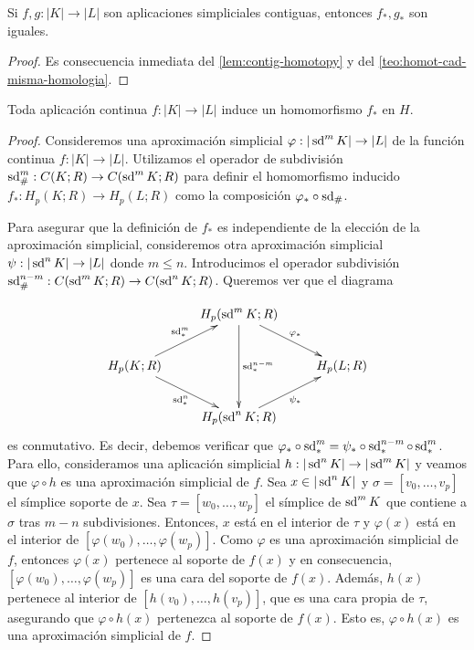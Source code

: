 \begin{corolario}
	\label{cor:contig-homotopy}
	Si $f,g : |K| \to |L|$ son aplicaciones simpliciales contiguas, entonces $f_*,g_*$ son iguales.
\end{corolario}
\begin{proof}
	Es consecuencia inmediata del \autoref{lem:contig-homotopy} y del \autoref{teo:homot-cad-misma-homologia}.
\end{proof}

\begin{teorema}
	Toda aplicación continua $f: |K| \to |L|$ induce un homomorfismo $f_*$ en $H$.
\end{teorema}
\begin{proof}
	Consideremos una aproximación simplicial \( \varphi : |\operatorname{sd}^m K| \to |L| \) de la función continua \( f: |K| \to |L| \). Utilizamos el operador de subdivisión \( \operatorname{sd}_\#^m : C(K; R) \to C(\operatorname{sd}^m K; R) \) para definir el homomorfismo inducido \( f_* : H_p(K; R) \to H_p(L; R) \) como la composición \( \varphi_* \circ \operatorname{sd}_\# \).
	
	Para asegurar que la definición de \( f_* \) es independiente de la elección de la aproximación simplicial, consideremos otra aproximación simplicial \( \psi : |\operatorname{sd}^n K| \to |L| \) donde \( m \leq n \). Introducimos el operador subdivisión \( \operatorname{sd}_\#^{n-m} : C(\operatorname{sd}^m K; R) \to C(\operatorname{sd}^n K; R) \). Queremos ver que el diagrama 
	
	\[
	\xymatrix{
		& H_p(\sd^m K;R) \ar@{->}[rd]^{\varphi_*} \ar@{->}[dd]^{\sd^{n-m}_*} &  \\
		H_p(K;R) \ar@{->}[ru]^{\sd^m_*} \ar@{->}[rd]_{\sd^n_*} &  & H_p(L;R) \\
		& H_p(\sd^n K;R) \ar@{->}[ru]_{\psi_*} & 
	}
	\]
	es conmutativo. Es decir, debemos verificar que \( \varphi_* \circ \operatorname{sd}^m_* = \psi_* \circ \operatorname{sd}_*^{n-m} \circ \operatorname{sd}_*^m \). Para ello, consideramos una aplicación simplicial \( h : |\operatorname{sd}^n K| \to |\operatorname{sd}^m K| \) y veamos que \( \varphi \circ h \) es una aproximación simplicial de \( f \). Sea \( x \in |\operatorname{sd}^n K| \) y \( \sigma = [v_0, \dots, v_p] \) el símplice soporte de \( x \). Sea \( \tau = [w_0, \dots, w_p] \) el símplice de \( \operatorname{sd}^m K \) que contiene a \( \sigma \) tras \( m-n \) subdivisiones. Entonces, \( x \) está en el interior de \( \tau \) y \( \varphi(x) \) está en el interior de \( [\varphi(w_0), \dots, \varphi(w_p)] \). Como $\varphi$ es una aproximación simplicial de $f$, entonces $\varphi(x)$ pertenece al soporte de $f(x)$ y en consecuencia, \( [\varphi(w_0), \dots, \varphi(w_p)] \) es una cara del soporte de \( f(x) \). Además, \( h(x) \) pertenece al interior de \( [h(v_0), \dots, h(v_p)] \), que es una cara propia de \( \tau \), asegurando que \( \varphi \circ h(x) \) pertenezca al soporte de \( f(x) \). Esto es, \( \varphi \circ h(x) \) es una aproximación simplicial de $f$.
	

\end{proof}
